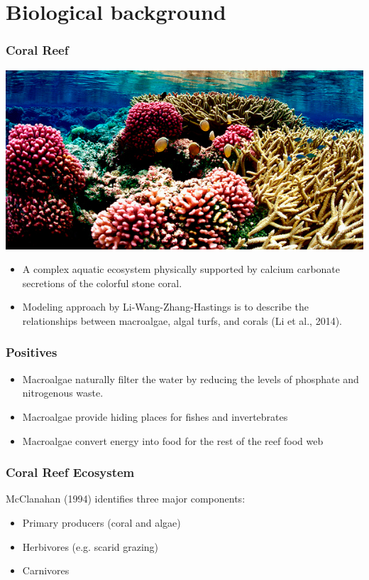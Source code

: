 
\section{Biological background}

\begin{frame}
\frametitle{Coral Reef}
\includegraphics[scale=.175]{./US-Wildlife-coral-1.jpg}
\begin{itemize}
\item A complex aquatic ecosystem physically supported by calcium carbonate secretions of the colorful stone coral.
\item Modeling approach by Li-Wang-Zhang-Hastings is to describe the relationships between macroalgae, algal turfs, and corals (Li et al., 2014).
\end{itemize}
\end{frame}

\begin{frame}
\frametitle{Positives}
\begin{itemize}
\item Macroalgae naturally filter the water by reducing the levels of phosphate and nitrogenous waste.
\item Macroalgae provide hiding places for fishes and invertebrates
\item Macroalgae convert energy into food for the rest of the reef food web
\end{itemize}
\end{frame}

\begin{frame}
\frametitle{Coral Reef Ecosystem} 

McClanahan (1994) identifies three major components:
\begin{itemize}
\item Primary producers (coral and algae)\\
\item Herbivores (e.g. scarid grazing)\\
\item Carnivores
\end{itemize}
\end{frame}

